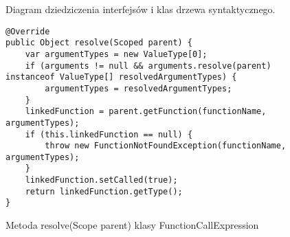\begin{figure}
{
}
\caption{Diagram dziedziczenia interfejsów i klas drzewa syntaktycznego.}
\label{fig:ast-uml}
\end{figure}

\begin{figure}
\begin{lstlisting}
@Override
public Object resolve(Scoped parent) {
    var argumentTypes = new ValueType[0];
    if (arguments != null && arguments.resolve(parent) instanceof ValueType[] resolvedArgumentTypes) {
        argumentTypes = resolvedArgumentTypes;
    }
    linkedFunction = parent.getFunction(functionName, argumentTypes);
    if (this.linkedFunction == null) {
        throw new FunctionNotFoundException(functionName, argumentTypes);
    }
    linkedFunction.setCalled(true);
    return linkedFunction.getType();
}
\end{lstlisting}
\caption{Metoda resolve(Scope parent) klasy FunctionCallExpression} \label{lst:resolver-function-call}
\end{figure}


